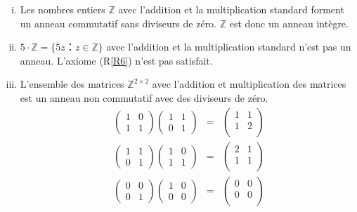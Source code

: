 \begin{example}
  \label{exe:32}
  \begin{enumerate}[i)]
  \item Les nombres entiers $ℤ$ avec l'addition et la multiplication standard forment un anneau commutatif sans diviseurs de zéro. $ℤ$ est donc un anneau intègre. 
  \item $5 ⋅ℤ = \{ 5 z ：z ∈ ℤ\}$ avec l'addition et la multiplication standard n'est pas un anneau. L'axiome (R\ref{R6}) n'est pas satisfait.
  \item L'ensemble des matrices  $ℤ^{2 ×2}$ avec l'addition et multiplication des matrices est un anneau non commutatif avec des diviseurs de zéro. 
    \begin{eqnarray*}
      \begin{pmatrix}
        1 & 0 \\
        1 & 1 
      \end{pmatrix}
       \begin{pmatrix}
        1 & 1 \\
         0& 1 
       \end{pmatrix}   & = &
                            \begin{pmatrix}
                               1 & 1 \\
                               1 & 2 \\
                             \end{pmatrix}  \\      
      \begin{pmatrix}
        1 & 1 \\
        0 & 1 
      \end{pmatrix}
       \begin{pmatrix}
        1 & 0 \\
         1 & 1 
       \end{pmatrix}   & = &
                            \begin{pmatrix}
                               2 & 1 \\
                               1 & 1 \\
                             \end{pmatrix}       
    \end{eqnarray*}
     \begin{eqnarray*}
      \begin{pmatrix}
        0 & 0 \\
        0 & 1 
      \end{pmatrix}
       \begin{pmatrix}
        1 & 0 \\
         0& 0 
       \end{pmatrix}   & = &
                            \begin{pmatrix}
                               0 & 0 \\
                               0 & 0 \\
                             \end{pmatrix}  
     \end{eqnarray*}
   \end{enumerate}
\end{example}



